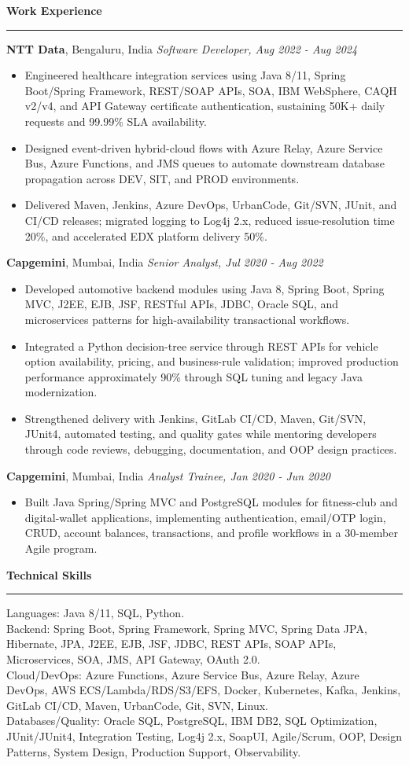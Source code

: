 \documentclass[10pt,letterpaper]{article}
\newcommand{\ressection}[1]{\vspace{2.6pt}\par\textbf{#1}\par\vspace{0.8pt}\hrule\vspace{1.6pt}}
\begin{document}
\ressection{Work Experience}
\textbf{NTT Data}, Bengaluru, India \hfill \textit{Software Developer, Aug 2022 - Aug 2024}
\begin{itemize}
  \item Engineered healthcare integration services using Java 8/11, Spring Boot/Spring Framework, REST/SOAP APIs, SOA, IBM WebSphere, CAQH v2/v4, and API Gateway certificate authentication, sustaining 50K+ daily requests and 99.99\% SLA availability.
  \item Designed event-driven hybrid-cloud flows with Azure Relay, Azure Service Bus, Azure Functions, and JMS queues to automate downstream database propagation across DEV, SIT, and PROD environments.
  \item Delivered Maven, Jenkins, Azure DevOps, UrbanCode, Git/SVN, JUnit, and CI/CD releases; migrated logging to Log4j 2.x, reduced issue-resolution time 20\%, and accelerated EDX platform delivery 50\%.
\end{itemize}
\textbf{Capgemini}, Mumbai, India \hfill \textit{Senior Analyst, Jul 2020 - Aug 2022}
\begin{itemize}
  \item Developed automotive backend modules using Java 8, Spring Boot, Spring MVC, J2EE, EJB, JSF, RESTful APIs, JDBC, Oracle SQL, and microservices patterns for high-availability transactional workflows.
  \item Integrated a Python decision-tree service through REST APIs for vehicle option availability, pricing, and business-rule validation; improved production performance approximately 90\% through SQL tuning and legacy Java modernization.
  \item Strengthened delivery with Jenkins, GitLab CI/CD, Maven, Git/SVN, JUnit4, automated testing, and quality gates while mentoring developers through code reviews, debugging, documentation, and OOP design practices.
\end{itemize}
\textbf{Capgemini}, Mumbai, India \hfill \textit{Analyst Trainee, Jan 2020 - Jun 2020}
\begin{itemize}
  \item Built Java Spring/Spring MVC and PostgreSQL modules for fitness-club and digital-wallet applications, implementing authentication, email/OTP login, CRUD, account balances, transactions, and profile workflows in a 30-member Agile program.
\end{itemize}

\ressection{Technical Skills}
Languages: Java 8/11, SQL, Python.\\
Backend: Spring Boot, Spring Framework, Spring MVC, Spring Data JPA, Hibernate, JPA, J2EE, EJB, JSF, JDBC, REST APIs, SOAP APIs, Microservices, SOA, JMS, API Gateway, OAuth 2.0.\\
Cloud/DevOps: Azure Functions, Azure Service Bus, Azure Relay, Azure DevOps, AWS ECS/Lambda/RDS/S3/EFS, Docker, Kubernetes, Kafka, Jenkins, GitLab CI/CD, Maven, UrbanCode, Git, SVN, Linux.\\
Databases/Quality: Oracle SQL, PostgreSQL, IBM DB2, SQL Optimization, JUnit/JUnit4, Integration Testing, Log4j 2.x, SoapUI, Agile/Scrum, OOP, Design Patterns, System Design, Production Support, Observability.
\end{document}
